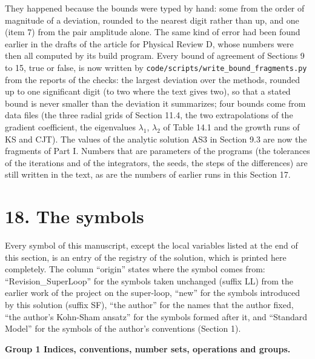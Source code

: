 \documentclass[
  10pt,
]{article}
\begin{document}
They happened because the bounds were typed by hand: some from the order
of magnitude of a deviation, rounded to the nearest digit rather than
up, and one (item 7) from the pair amplitude alone. The same kind of
error had been found earlier in the drafts of the article for Physical
Review D, whose numbers were then all computed by its build program.
Every bound of agreement of Sections 9 to 15, true or false, is now
written by \texttt{code/scripts/write\_bound\_fragments.py} from the
reports of the checks: the largest deviation over the methods, rounded
up to one significant digit (to two where the text gives two), so that a
stated bound is never smaller than the deviation it summarizes; four
bounds come from data files (the three radial grids of Section 11.4, the
two extrapolations of the gradient coefficient, the eigenvalues
\(\lambda_1\), \(\lambda_2\) of Table 14.1 and the growth runs of KS and
CJT). The values of the analytic solution AS3 in Section 9.3 are now the
fragments of Part I. Numbers that are parameters of the programs (the
tolerances of the iterations and of the integrators, the seeds, the
steps of the differences) are still written in the text, as are the
numbers of earlier runs in this Section 17.

\hypertarget{the-symbols}{%
\section{18. The symbols}\label{the-symbols}}

Every symbol of this manuscript, except the local variables listed at
the end of this section, is an entry of the registry of the solution,
which is printed here completely. The column ``origin'' states where the
symbol comes from: ``Revision\_SuperLoop'' for the symbols taken
unchanged (suffix LL) from the earlier work of the project on the
super-loop, ``new'' for the symbols introduced by this solution (suffix
SF), ``the author'' for the names that the author fixed, ``the author's
Kohn-Sham ansatz'' for the symbols formed after it, and ``Standard
Model'' for the symbols of the author's conventions (Section 1).

\textbf{Group 1 Indices, conventions, number sets, operations and
groups.}
\end{document}
